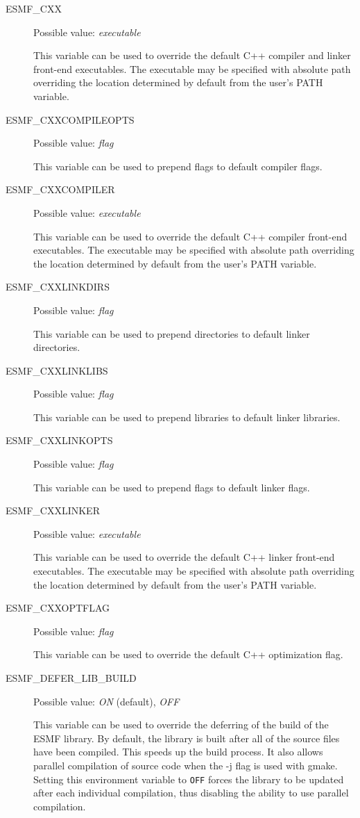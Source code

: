 \begin{description}
\item[ESMF\_CXX]
Possible value: {\em executable}

This variable can be used to override the default C++ compiler and linker
front-end executables. The executable may be specified with absolute path
overriding the location determined by default from the user's PATH variable.

\item[ESMF\_CXXCOMPILEOPTS]
Possible value: {\em flag}

This variable can be used to prepend flags to default compiler flags.

\item[ESMF\_CXXCOMPILER]
Possible value: {\em executable}

This variable can be used to override the default C++ compiler
front-end executables. The executable may be specified with absolute path
overriding the location determined by default from the user's PATH variable.

\item[ESMF\_CXXLINKDIRS]
Possible value: {\em flag}

This variable can be used to prepend directories to default linker directories.

\item[ESMF\_CXXLINKLIBS]
Possible value: {\em flag}

This variable can be used to prepend libraries to default linker libraries.

\item[ESMF\_CXXLINKOPTS]
Possible value: {\em flag}

This variable can be used to prepend flags to default linker flags.

\item[ESMF\_CXXLINKER]
Possible value: {\em executable}

This variable can be used to override the default C++ linker
front-end executables. The executable may be specified with absolute path
overriding the location determined by default from the user's PATH variable.

\item[ESMF\_CXXOPTFLAG]
Possible value: {\em flag}

This variable can be used to override the default C++ optimization flag.

\item[ESMF\_DEFER\_LIB\_BUILD]
Possible value: {\em ON} (default), {\em OFF}

This variable can be used to override the deferring of the build of the
ESMF library.  By default, the library is built after all of the source
files have been compiled.  This speeds up the build process. It also
allows parallel compilation of source code when the -j flag is used with
gmake.  Setting this environment variable to {\tt OFF} forces the library to
be updated after each individual compilation, thus disabling the ability
to use parallel compilation.


\end{description}
